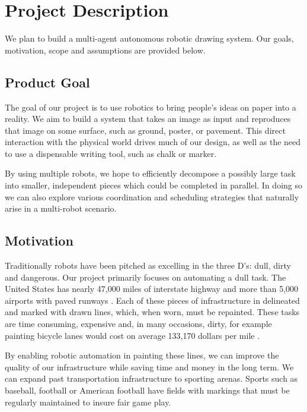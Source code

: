 
\section{Project Description}
\label{sec:project_description}
We plan to build a multi-agent autonomous robotic drawing system. Our goals, motivation, scope and assumptions are provided below.

\subsection{Product Goal}
\label{sec:project_goal}
The goal of our project is to use robotics to bring people's ideas on paper into a reality. 
We aim to build a system that takes an image as input and reproduces that image on some surface, such as ground, poster, or pavement.
This direct interaction with the physical world drives much of our design, as well as the need to use a dispensable writing tool, such as chalk or marker. 

By using multiple robots, we hope to efficiently decompose a possibly large task into smaller, independent pieces which could be completed in parallel.
In doing so we can also explore various coordination and scheduling strategies that naturally arise in a multi-robot scenario. 


\subsection{Motivation}
\label{sec:motivation}

Traditionally robots have been pitched as excelling in the three D's: dull, dirty and dangerous. Our project primarily focuses on automating a dull task. The United States has nearly 47,000 miles of interstate highway and more than 5,000 airports with paved runways \cite{buildfuture}. Each of these pieces of infrastructure in delineated and marked with drawn lines, which, when worn, must be repainted. These tasks are time consuming, expensive and, in many occasions, dirty, for example painting bicycle lanes would cost on average 133,170 dollars per mile \cite{bicyclist}.

By enabling robotic automation in painting these lines, we can improve the quality of our infrastructure while saving time and money in the long term. We can expand past transportation infrastructure to sporting arenas. Sports such as baseball, football or American football have fields with markings that must be regularly maintained to insure fair game play. 

